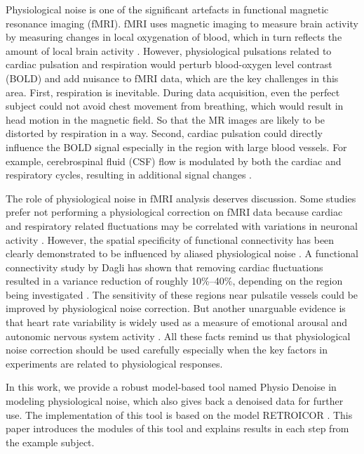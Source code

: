 Physiological noise is one of the significant artefacts in functional magnetic resonance imaging (fMRI).
fMRI uses magnetic imaging to measure brain activity by measuring changes in local oxygenation of blood,
which in turn reflects the amount of local brain activity \cite{poldrack2011handbook}.
However, physiological pulsations related to cardiac pulsation 
and respiration would perturb blood-oxygen level contrast (BOLD) and
add nuisance to fMRI data, 
which are the key challenges in this area. 
First, respiration is inevitable. 
During data acquisition, even the perfect subject could not avoid chest movement from breathing, 
which would result in head motion in the magnetic field. 
So that the MR images are likely to be distorted by respiration in a way.
Second, cardiac pulsation could directly influence the BOLD signal 
especially in the region with large blood vessels. 
For example, cerebrospinal fluid (CSF) flow is modulated 
by both the cardiac and respiratory cycles, resulting in additional signal changes \cite{birn2012role}.

The role of physiological noise in fMRI analysis deserves discussion. 
Some studies prefer not performing a physiological correction on fMRI data because cardiac and respiratory related fluctuations may be correlated with variations in neuronal activity \cite{birn2012role}.
However, the spatial specificity of functional connectivity has been clearly demonstrated to be influenced by aliased physiological noise \cite{lowe1998functional}.
A functional connectivity study \cite{dagli1999localization} by Dagli has shown that removing cardiac fluctuations resulted in a variance reduction of roughly 10\%–40\%, 
depending on the region being investigated \cite{dagli1999localization}.
The sensitivity of these regions near pulsatile vessels could be improved by physiological noise correction. 
But another unarguable evidence is that heart rate variability is widely used as a measure of emotional arousal and autonomic nervous system activity \cite{birn2012role}.
All these facts remind us that physiological noise correction should be used carefully especially when the key factors in experiments are related to physiological responses.

In this work, we provide a robust model-based tool named Physio Denoise in modeling physiological noise, which also gives back a denoised data for further use. 
The implementation of this tool is based on the model RETROICOR \cite{glover2000image}.
This paper introduces the modules of this tool and explains results in each step from the example subject.